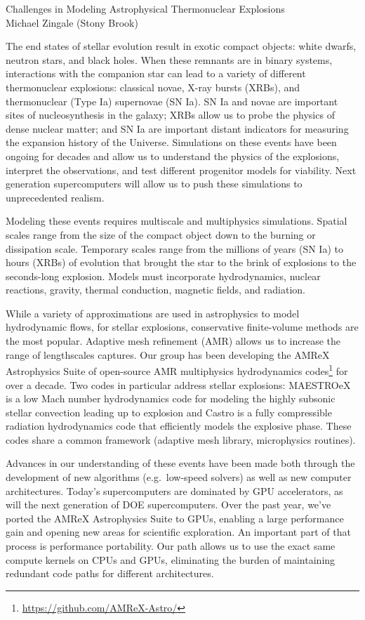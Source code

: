 \documentclass[11pt]{article}
\begin{document}
\begin{center}
{\Large Challenges in Modeling Astrophysical Thermonuclear Explosions} \\[0.25em]
Michael Zingale (Stony Brook)
\end{center}

The end states of stellar evolution result in exotic compact objects:
white dwarfs, neutron stars, and black holes.  When these remnants are
in binary systems, interactions with the companion star can lead to a
variety of different thermonuclear explosions: classical novae, X-ray
bursts (XRBs), and thermonuclear (Type Ia) supernovae (SN Ia).  SN Ia
and novae are important sites of nucleosynthesis in the galaxy; XRBs
allow us to probe the physics of dense nuclear matter; and SN Ia are
important distant indicators for measuring the expansion history of
the Universe.  Simulations on these events have been ongoing for
decades and allow us to understand the physics of the explosions,
interpret the observations, and test different progenitor models for
viability.  Next generation supercomputers will allow us to push these
simulations to unprecedented realism.

Modeling these events requires multiscale and multiphysics simulations.
Spatial scales range from the size of the compact object
down to the burning or dissipation scale.  Temporary scales range from
the millions of years (SN Ia) to hours (XRBs) of evolution that
brought the star to the brink of explosions to the seconds-long
explosion.  Models must incorporate hydrodynamics, nuclear reactions,
gravity, thermal conduction, magnetic fields, and radiation.

While a variety of approximations are used in astrophysics to model
hydrodynamic flows, for stellar explosions, conservative finite-volume
methods are the most popular.  Adaptive mesh refinement (AMR) allows
us to increase the range of lengthscales captures.  Our group has been
developing the AMReX Astrophysics Suite of open-source AMR
multiphysics hydrodynamics
codes\footnote{\url{https://github.com/AMReX-Astro/}} for over a
decade.  Two codes in particular address stellar explosions: MAESTROeX
is a low Mach number hydrodynamics code for modeling the highly
subsonic stellar convection leading up to explosion and Castro is a
fully compressible radiation hydrodynamics code that efficiently
models the explosive phase.  These codes share a common framework
(adaptive mesh library, microphysics routines).

Advances in our understanding of these events have been made both
through the development of new algorithms (e.g.\ low-speed solvers) as
well as new computer architectures.  Today's supercomputers are
dominated by GPU accelerators, as will the next generation of
DOE supercomputers.  Over the past year,
we've ported the AMReX Astrophysics Suite to GPUs, enabling a large
performance gain and opening new areas for scientific exploration.  An
important part of that process is performance portability.  Our path
allows us to use the exact same compute kernels on CPUs and GPUs,
eliminating the burden of maintaining redundant code paths for
different architectures.
\end{document}

